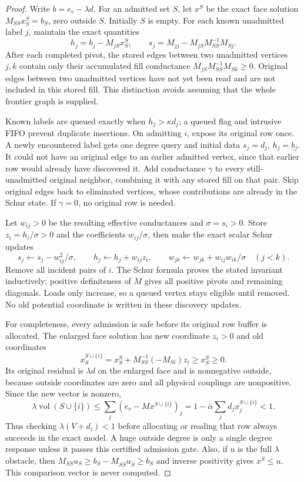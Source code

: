 \begin{proof}
Write $b=e_v-\lambda d$. For an admitted set $S$, let $x^S$ be the exact
face solution $M_{SS}x^S_S=b_S$, zero outside $S$. Initially $S$ is empty.
For each known unadmitted label $j$, maintain the exact quantities
\[
 h_j=b_j-M_{jS}x^S_S,
 \qquad s_j=M_{jj}-M_{jS}M_{SS}^{-1}M_{Sj}.
\]
After each completed pivot, the stored edges between two unadmitted
vertices $j,k$ contain only their accumulated fill conductance
$M_{jS}M_{SS}^{-1}M_{Sk}\geq0$. Original edges between two unadmitted
vertices have not yet been read and are not included in this stored fill.
This distinction avoids assuming that the whole frontier graph is supplied.

Known labels are queued exactly when $h_j>\kappa d_j$; a queued flag and
intrusive FIFO prevent duplicate insertions. On admitting $i$, expose its
original row once. A newly encountered label gets one degree query and
initial data $s_j=d_j$, $h_j=b_j$. It could not have an original edge to
an earlier admitted vertex, since that earlier row would already have
discovered it. Add conductance $\gamma$ to every still-unadmitted original
neighbor, combining it with any stored fill on that pair. Skip original
edges back to eliminated vertices, whose contributions are already in the
Schur state. If $\gamma=0$, no original row is needed.

Let $w_{ij}>0$ be the resulting effective conductances and $\sigma=s_i>0$.
Store $z_i=h_i/\sigma>0$ and the coefficients $w_{ij}/\sigma$, then make
the exact scalar Schur updates
\[
 s_j\gets s_j-w_{ij}^2/\sigma,\qquad
 h_j\gets h_j+w_{ij}z_i,\qquad
 w_{jk}\gets w_{jk}+w_{ij}w_{ik}/\sigma\quad(j<k).
\]
Remove all incident pairs of $i$. The Schur formula proves the stated
invariant inductively; positive definiteness of $M$ gives all positive
pivots and remaining diagonals. Loads only increase, so a queued vertex
stays eligible until removed. No old potential coordinate is written in
these discovery updates.

For completeness, every admission is safe before its original row buffer
is allocated. The enlarged face solution has new coordinate $z_i>0$ and
old coordinates
\[
 x^{S\cup\{i\}}_S
 =x^S_S+M_{SS}^{-1}(-M_{Si})z_i\geq x^S_S\geq0.
\]
Its original residual is $\lambda d$ on the enlarged face and is
nonnegative outside, because outside coordinates are zero and all physical
couplings are nonpositive. Since the new vector is nonzero,
\[
 \lambda\operatorname{vol}(S\cup\{i\})
 \leq\sum_j(e_v-Mx^{S\cup\{i\}})_j
 =1-\bar\alpha\sum_jd_jx^{S\cup\{i\}}_j<1.
\]
Thus checking $\lambda(V+d_i)<1$ before allocating or reading that row
always succeeds in the exact model. A huge outside degree is only a single
degree response unless it passes this certified admission gate. Also, if
$u$ is the full $\lambda$ obstacle, then
$M_{SS}u_S\geq b_S-M_{S\bar S}u_{\bar S}\geq b_S$ and inverse
positivity gives $x^S\leq u$. This comparison vector is never computed.


\end{proof}
